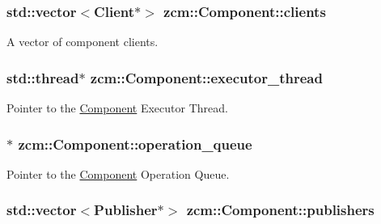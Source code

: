 \subsubsection[{\texorpdfstring{clients}{clients}}]{\setlength{\rightskip}{0pt plus 5cm}std\+::vector$<${\bf Client}$\ast$$>$ zcm\+::\+Component\+::clients\hspace{0.3cm}{\ttfamily [protected]}}\hypertarget{classzcm_1_1Component_a940e1b9755cd9f2bea95bda880999626}{}\label{classzcm_1_1Component_a940e1b9755cd9f2bea95bda880999626}


A vector of component clients. 

\subsubsection[{\texorpdfstring{executor\+\_\+thread}{executor_thread}}]{\setlength{\rightskip}{0pt plus 5cm}std\+::thread$\ast$ zcm\+::\+Component\+::executor\+\_\+thread\hspace{0.3cm}{\ttfamily [protected]}}\hypertarget{classzcm_1_1Component_a392ca3b6cd537cd7aa1d4db31dacdf4d}{}\label{classzcm_1_1Component_a392ca3b6cd537cd7aa1d4db31dacdf4d}


Pointer to the \hyperlink{classzcm_1_1Component}{Component} Executor Thread. 

\subsubsection[{\texorpdfstring{operation\+\_\+queue}{operation_queue}}]{$\ast$ zcm\+::\+Component\+::operation\+\_\+queue\hspace{0.3cm}{\ttfamily [protected]}}\hypertarget{classzcm_1_1Component_a4c9f3591c18dde89bc3c2af7717c6692}{}\label{classzcm_1_1Component_a4c9f3591c18dde89bc3c2af7717c6692}


Pointer to the \hyperlink{classzcm_1_1Component}{Component} Operation Queue. 

\subsubsection[{\texorpdfstring{publishers}{publishers}}]{\setlength{\rightskip}{0pt plus 5cm}std\+::vector$<${\bf Publisher}$\ast$$>$ zcm\+::\+Component\+::publishers\hspace{0.3cm}{\ttfamily [protected]}}\hypertarget{classzcm_1_1Component_a4dcce63b0b5495bc15bd18e5dce86094}{}\label{classzcm_1_1Component_a4dcce63b0b5495bc15bd18e5dce86094}


